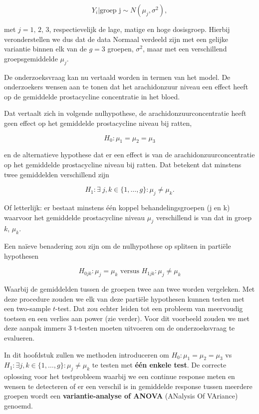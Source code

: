 \documentclass[
  dutch,
  letterpaper,
  12pt]{book}
\theoremstyle{definition}
\theoremstyle{definition}
\theoremstyle{definition}
\theoremstyle{remark}
\begin{document}
\[Y_i \vert \text{groep j} \sim N(\mu_j,\sigma^2),\]

met \(j= \text{1, 2, 3}\), respectievelijk de lage, matige en hoge
dosisgroep. Hierbij veronderstellen we dus dat de data Normaal verdeeld
zijn met een gelijke variantie binnen elk van de \(g=3\) groepen,
\(\sigma^2\), maar met een verschillend groepsgemiddelde \(\mu_j\).

De onderzoeksvraag kan nu vertaald worden in termen van het model. De
onderzoekers wensen aan te tonen dat het arachidonzuur niveau een effect
heeft op de gemiddelde prostacycline concentratie in het bloed.

Dat vertaalt zich in volgende nulhypothese, de arachidonzuurconcentratie
heeft geen effect op het gemiddelde prostacycline niveau bij ratten,

\[H_0:\mu_1=\mu_2 = \mu_3\]

en de alternatieve hypothese dat er een effect is van de
arachidonzuurconcentratie op het gemiddelde prostacycline niveau bij
ratten. Dat betekent dat minstens twee gemiddelden verschillend zijn

\[H_1: \exists\ j,k \in \{1,\ldots,g\} : \mu_j\neq\mu_k.\]

Of letterlijk: er bestaat minstens één koppel behandelingsgroepen (j en
k) waarvoor het gemiddelde prostacycline niveau \(\mu_j\) verschillend
is van dat in groep \(k\), \(\mu_k\).

Een naïeve benadering zou zijn om de nulhypothese op splitsen in
partiële hypothesen

\[H_{0jk}: \mu_j=\mu_k \text{ versus } H_{1jk}: \mu_j \neq \mu_k\]

Waarbij de gemiddelden tussen de groepen twee aan twee worden
vergeleken. Met deze procedure zouden we elk van deze partiële
hypothesen kunnen testen met een two-sample \(t\)-test. Dat zou echter
leiden tot een probleem van meervoudig toetsen en een verlies aan power
(zie verder). Voor dit voorbeeld zouden we met deze aanpak immers 3
t-testen moeten uitvoeren om de onderzoeksvraag te evalueren.

In dit hoofdstuk zullen we methoden introduceren om
\(H_0:\mu_1=\mu_2=\mu_3\) vs
\(H_1: \exists j,k \in \{1,\ldots,g\} : \mu_j\neq\mu_k\) te testen met
\textbf{één enkele test}. De correcte oplossing voor het testprobleem
waarbij we een continue response meten en wensen te detecteren of er een
verschil is in gemiddelde response tussen meerdere groepen wordt een
\textbf{variantie-analyse of ANOVA} (ANalysis Of VAriance) genoemd.
\end{document}
